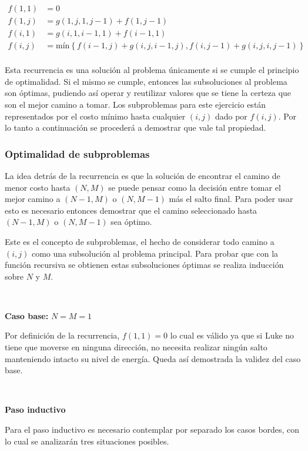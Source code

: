 	\begin{align*}
		f(1, 1) &= 0 \\
		f(1, j) &= g(1, j, 1, j - 1) + f(1, j - 1) \\
		f(i, 1) &= g(i, 1, i - 1, 1) + f(i - 1, 1) \\
		f(i, j) &= \text{mín}\left \{ f(i - 1, j) + g(i, j, i - 1, j), f(i, j - 1) + g(i, j, i, j - 1) \right \} \\
	\end{align*}

	Esta recurrencia es una solución al problema únicamente si se cumple el principio
	de optimalidad. Si el mismo se cumple, entonces las subsoluciones al problema son
	óptimas, pudiendo así operar y reutilizar valores que se tiene la certeza
	que son el mejor camino a tomar. Los subproblemas para este ejercicio están
	representados por el costo mínimo hasta cualquier $(i, j)$ dado por $f(i,
	j)$. Por lo tanto a continuación se procederá a demostrar que vale tal
	propiedad.

	\subsubsection*{Optimalidad de subproblemas}

	La idea detrás de la recurrencia es que la solución de encontrar el camino
	de menor costo hasta $(N, M)$ se puede pensar como la decisión entre tomar
	el mejor camino a $(N - 1, M)$ o $(N, M - 1)$ más el salto final. Para poder
	usar esto es necesario entonces demostrar que el camino seleccionado hasta
	$(N - 1, M)$ o $(N, M - 1)$ sea óptimo.

	Este es el concepto de subproblemas, el hecho de considerar todo camino a
	$(i, j)$ como una subsolución al problema principal. Para probar que con la
	función recursiva se obtienen estas subsoluciones óptimas se realiza
	inducción sobre $N$ y $M$.

	~

	\textbf{Caso base: } $N = M = 1$

	Por definición de la recurrencia, $f(1, 1) = 0$ lo cual es válido ya que si
	Luke no tiene que moverse en ninguna dirección, no necesita realizar ningún
	salto manteniendo intacto su nivel de energía. Queda así demostrada la
	validez del caso base.

	~

	\textbf{Paso inductivo}

	Para el paso inductivo es necesario contemplar por separado los casos
	bordes, con lo cual se analizarán tres situaciones posibles.

